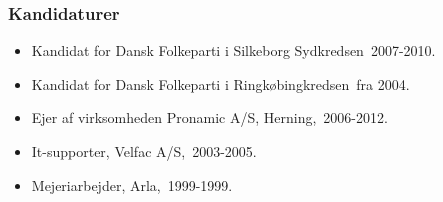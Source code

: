 \documentclass[11pt, a4paper]{awesome-cv}
\begin{document}
\begin{cvletter}
\subsubsection*{Kandidaturer}
\begin{itemize}
\item Kandidat for Dansk Folkeparti i Silkeborg Sydkredsen 2007-2010.
\item Kandidat for Dansk Folkeparti i Ringkøbingkredsen fra 2004.
\end{itemize}
\begin{itemize}
\item Ejer af virksomheden Pronamic A/S, Herning, 2006-2012.
\item It-supporter, Velfac A/S, 2003-2005.
\item Mejeriarbejder, Arla, 1999-1999.
\end{itemize}
\end{cvletter}
\end{document}

